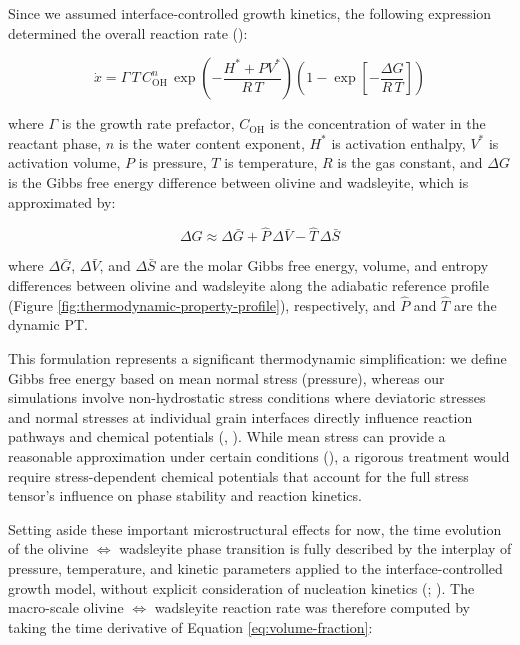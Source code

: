 \documentclass[
  paper=a4,
  ,captions=tableheading
]{scrartcl}
\begin{document}
Since we assumed interface-controlled growth kinetics, the following
expression determined the overall reaction rate
():

\begin{equation}
  \dot{x} = \Gamma\, T\, C_\mathrm{OH}^n\, \exp\!\left(-\frac{H^{\ast} + P V^{\ast}}{R\, T}\right) \left(1 - \exp\!\left[-\frac{\Delta G}{R\, T}\right] \right)
  \label{eq:growth-rate}
\end{equation}

where \(\Gamma\) is the growth rate prefactor, \(C_\mathrm{OH}\) is the
concentration of water in the reactant phase, \(n\) is the water content
exponent, \(H^{\ast}\) is activation enthalpy, \(V^{\ast}\) is
activation volume, \(P\) is pressure, \(T\) is temperature, \(R\) is the
gas constant, and \(\Delta G\) is the Gibbs free energy difference
between olivine and wadsleyite, which is approximated by:

\begin{equation}
  \Delta G \approx \Delta \bar{G} + \hat{P}\, \Delta \bar{V} - \hat{T}\, \Delta \bar{S}
  \label{eq:gibbs}
\end{equation}

where \(\Delta \bar{G}\), \(\Delta \bar{V}\), and \(\Delta \bar{S}\) are
the molar Gibbs free energy, volume, and entropy differences between
olivine and wadsleyite along the adiabatic reference profile (Figure
\ref{fig:thermodynamic-property-profile}), respectively, and \(\hat{P}\)
and \(\hat{T}\) are the dynamic PT.

This formulation represents a significant thermodynamic simplification:
we define Gibbs free energy based on mean normal stress (pressure),
whereas our simulations involve non-hydrostatic stress conditions where
deviatoric stresses and normal stresses at individual grain interfaces
directly influence reaction pathways and chemical potentials
(,
). While mean stress can provide a
reasonable approximation under certain conditions
(), a rigorous treatment would
require stress-dependent chemical potentials that account for the full
stress tensor's influence on phase stability and reaction kinetics.

Setting aside these important microstructural effects for now, the time
evolution of the olivine \(\Leftrightarrow\) wadsleyite phase transition
is fully described by the interplay of pressure, temperature, and
kinetic parameters applied to the interface-controlled growth model,
without explicit consideration of nucleation kinetics
(;
). The macro-scale olivine
\(\Leftrightarrow\) wadsleyite reaction rate was therefore computed by
taking the time derivative of Equation \ref{eq:volume-fraction}:
\end{document}
